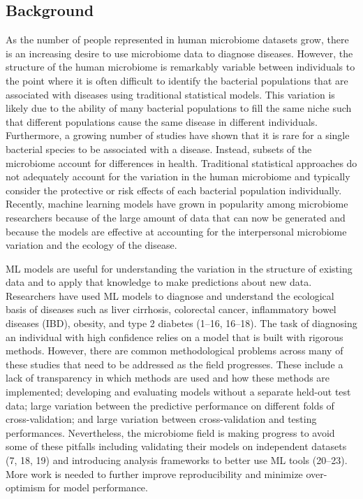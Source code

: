 \documentclass[11pt,]{article}
\begin{document}
\newpage

\subsection{Background}\label{background}

As the number of people represented in human microbiome datasets grow,
there is an increasing desire to use microbiome data to diagnose
diseases. However, the structure of the human microbiome is remarkably
variable between individuals to the point where it is often difficult to
identify the bacterial populations that are associated with diseases
using traditional statistical models. This variation is likely due to
the ability of many bacterial populations to fill the same niche such
that different populations cause the same disease in different
individuals. Furthermore, a growing number of studies have shown that it
is rare for a single bacterial species to be associated with a disease.
Instead, subsets of the microbiome account for differences in health.
Traditional statistical approaches do not adequately account for the
variation in the human microbiome and typically consider the protective
or risk effects of each bacterial population individually. Recently,
machine learning models have grown in popularity among microbiome
researchers because of the large amount of data that can now be
generated and because the models are effective at accounting for the
interpersonal microbiome variation and the ecology of the disease.

ML models are useful for understanding the variation in the structure of
existing data and to apply that knowledge to make predictions about new
data. Researchers have used ML models to diagnose and understand the
ecological basis of diseases such as liver cirrhosis, colorectal cancer,
inflammatory bowel diseases (IBD), obesity, and type 2 diabetes (1--16,
16--18). The task of diagnosing an individual with high confidence
relies on a model that is built with rigorous methods. However, there
are common methodological problems across many of these studies that
need to be addressed as the field progresses. These include a lack of
transparency in which methods are used and how these methods are
implemented; developing and evaluating models without a separate
held-out test data; large variation between the predictive performance
on different folds of cross-validation; and large variation between
cross-validation and testing performances. Nevertheless, the microbiome
field is making progress to avoid some of these pitfalls including
validating their models on independent datasets (7, 18, 19) and
introducing analysis frameworks to better use ML tools (20--23). More
work is needed to further improve reproducibility and minimize
over-optimism for model performance.
\end{document}
